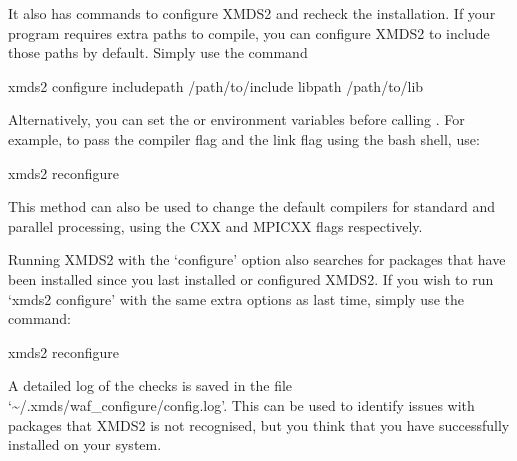\documentclass[letterpaper,10pt,english]{sphinxmanual}
\begin{document}
\sphinxAtStartPar
It also has commands to configure XMDS2 and recheck the installation.  If your program requires extra paths to compile, you can configure XMDS2 to include those paths by default.  Simply use the command

\begin{sphinxVerbatim}[commandchars=\\\{\}]
\PYGZdl{} xmds2 \PYGZhy{}\PYGZhy{}configure \PYGZhy{}\PYGZhy{}include\PYGZhy{}path /path/to/include \PYGZhy{}\PYGZhy{}lib\PYGZhy{}path /path/to/lib
\end{sphinxVerbatim}

\sphinxAtStartPar
Alternatively, you can set the  or  environment variables before calling .  For example, to pass the compiler flag  and the link flag  using the bash shell, use:

\begin{sphinxVerbatim}[commandchars=\\\{\}]
\PYGZdl{}  
\PYGZdl{}  
\PYGZdl{} xmds2 \PYGZhy{}\PYGZhy{}reconfigure
\end{sphinxVerbatim}

\sphinxAtStartPar
This method can also be used to change the default compilers for standard and parallel processing, using the CXX and MPICXX flags respectively.

\sphinxAtStartPar
Running XMDS2 with the ‘\textendash{}configure’ option also searches for packages that have been installed since you last installed or configured XMDS2.  If you wish to run ‘xmds2 \textendash{}configure’ with the same extra options as last time, simply use the command:

\begin{sphinxVerbatim}[commandchars=\\\{\}]
\PYGZdl{} xmds2 \PYGZhy{}\PYGZhy{}reconfigure
\end{sphinxVerbatim}

\sphinxAtStartPar
A detailed log of the checks is saved in the file ‘\textasciitilde{}/.xmds/waf\_configure/config.log’.  This can be used to identify issues with packages that XMDS2 is not recognised, but you think that you have successfully installed on your system.
\end{document}

